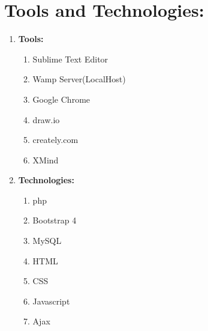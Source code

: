 \documentclass[a4paper,12pt]{report}
\begin{document}
\section*{Tools and Technologies:}
\begin{enumerate}
    \item \textbf{Tools:} 
    \begin{enumerate}
        \item Sublime Text Editor
        \item Wamp Server(LocalHost)
        \item Google Chrome
        \item draw.io
        \item creately.com
        \item XMind
    \end{enumerate}
    
    \item \textbf{Technologies:} 
    \begin{enumerate}
        \item php
        \item Bootstrap 4
        \item MySQL
        \item HTML
        \item CSS
        \item Javascript
        \item Ajax
    \end{enumerate}
\end{enumerate}
\end{document}
